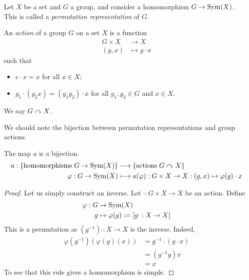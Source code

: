 \documentclass{../template/note}
\begin{document}
    Let $X$ be a set and $G$ a group, and consider a homomorphism $G \to \operatorname{Sym}(X)$. This is called a \emph{permutation representation} of $G$.

    \begin{definition}
        An \emph{action} of a group $G$ on a set $X$ is a function
        \begin{align*}
            G \times X &\to X \\
            (g, x) &\mapsto g \cdot x
        \end{align*}
        such that
        \begin{itemize}
            \item $e \cdot x = x$ for all $x \in X$;
            \item $g_1 \cdot (g_2 x) = (g_1g_2) \cdot x$ for all $g_1, g_2 \in G$ and $x \in X$.
        \end{itemize}
        We say $G \curvearrowright X$.
    \end{definition}
    
    We should note the bijection between permutation representations and group actions.

    \begin{proposition}
        The map $a$ is a bijection.
        \begin{align*}
        a: \{\text{homomorphisms } G \to \operatorname{Sym}(X)\} &\longrightarrow \{\text{actions } G \curvearrowright X\} \\
        \varphi: G \to \operatorname{Sym}(X) &\longmapsto a(\varphi): G \times X \to X: (g, x) \mapsto \varphi(g) \cdot x
    \end{align*}
    \end{proposition}
    
    \begin{proof}
        Let us simply construct an inverse. Let $\cdot: G \times X \to X$ be an action. Define
        \begin{align*}
            \varphi: G &\to \operatorname{Sym}(X) \\
            g &\mapsto \varphi(g) := [g \cdot: X \to X]
        \end{align*}
        This is a permutation as $(g^{-1}) \cdot: X \to X$ is the inverse. Indeed,
        \begin{align*}
            \varphi(g^{-1})(\varphi(g)(x)) &= g^{-1} \cdot (g \cdot x) \\
            &= (g^{-1}g)x \\
            &= x
        \end{align*}
        To see that this rule gives a homomorphism is simple.
    \end{proof}
    
\end{document}
